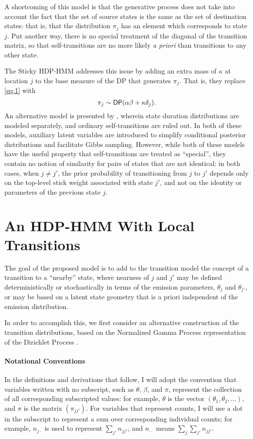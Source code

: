 A shortcoming of this model is that the generative process does not
take into account the fact that the set of source states is the same
as the set of destination states: that is, that the distribution $\pi_j$
has an element which corresponds to state $j$.  Put another way, there
is no special treatment of the diagonal of the transition matrix, so
that self-transitions are no more likely {\it a priori} than
transitions to any other state.  

The Sticky HDP-HMM \citep{fox2008hdp}
addresses this issue by adding an extra mass of $\kappa$ at location $j$ to the base
measure of the DP that generates $\pi_j$.  That is, they replace
\eqref{eq:1} with
\begin{equation}
  \label{eq:6}
  \pi_j \sim \mathsf{DP}(\alpha\beta + \kappa \delta_j).
\end{equation}
An alternative model is presented by \cite{johnson2013bayesian}, wherein 
state duration distributions are modeled
separately, and ordinary self-transitions are ruled out.  In both of
these models, auxiliary latent variables are introduced to simplify
conditional posterior distributions and facilitate Gibbs sampling.
However, while both of these models have the useful property that
self-transitions are treated as ``special'', they contain no notion of
similarity for pairs of states that are not identical: 
in both cases, when $j \neq j'$, the prior probability of
transitioning from $j$ to $j'$ depends only on the top-level stick
weight associated with state $j'$, and not on the identity or
parameters of the previous state $j$.

\section{An HDP-HMM With Local Transitions}

The goal of the proposed model 
is to add to the transition model the concept of a transition to
a ``nearby'' state, where nearness of $j$ and $j'$ may be defined
deterministically or stochastically in
terms of the emission parameters, $\theta_j$ and $\theta_{j'}$, or may
be based on a latent state geometry that is a priori independent of
the emission distribution.

In order to accomplish this, we first
consider an alternative construction of the transition distributions,
based on the Normalized Gamma Process representation of the Dirichlet
Process \citep{ferguson1973bayesian}.

\paragraph{Notational Conventions} 
In the definitions and derivations that follow, I will adopt the
convention that variables written with no subscript, such as $\theta$,
$\beta$, and $\pi$, represent the collection of all corresponding
subscripted values: for example, $\theta$ is the vector $(\theta_1, \theta_2,
\dots)$, and $\pi$ is the matrix $(\pi_{jj'})$.  For variables that
represent counts, I will use a dot in the subscript to represent a sum
over corresponding individual counts; for example, $n_{j\cdot}$ is
used to represent $\sum_{j'} n_{jj'}$, and $n_{\cdot\cdot}$ means
$\sum_{j}\sum_{j'} n_{jj'}$.

